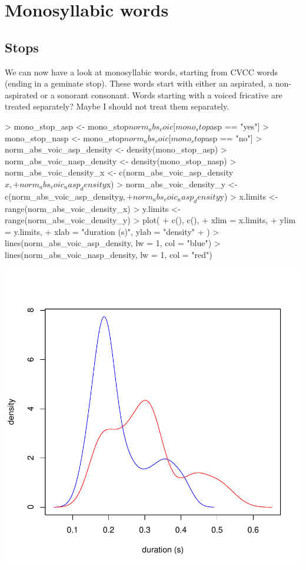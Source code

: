 \documentclass[a4paper,11pt]{article}
\begin{document}
\section{Monosyllabic words}

\subsection{Stops}

We can now have a look at monosyllabic words, starting from CVCC words (ending in a geminate stop).
These words start with either an aspirated, a non-aspirated or a sonorant consonant.
Words starting with a voiced fricative are treated separately?
Maybe I should not treat them separately.

\begin{Schunk}
\begin{Sinput}
> mono_stop_asp <- mono_stop$norm_abs_voic[mono_stop$asp == "yes"]
> mono_stop_nasp <- mono_stop$norm_abs_voic[mono_stop$asp == "no"]
> norm_abs_voic_asp_density <- density(mono_stop_asp)
> norm_abs_voic_nasp_density <- density(mono_stop_nasp)
> norm_abs_voic_density_x <- c(norm_abs_voic_asp_density$x, 
+                                   norm_abs_voic_nasp_density$x)
> norm_abs_voic_density_y <- c(norm_abs_voic_asp_density$y, 
+                                   norm_abs_voic_nasp_density$y)
> x.limits <- range(norm_abs_voic_density_x)
> y.limits <- range(norm_abs_voic_density_y)
> plot(
+ c(), c(),
+ xlim = x.limits,
+ ylim = y.limits,
+ xlab = "duration (s)", ylab = "density"
+ )
> lines(norm_abs_voic_asp_density, lw = 1, col = "blue")
> lines(norm_abs_voic_nasp_density, lw = 1, col = "red")
\end{Sinput}
\end{Schunk}
\includegraphics{analysis-007}
\end{document}
